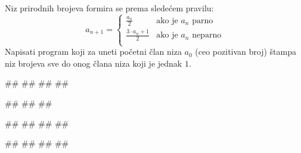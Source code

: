 \begin{Exercise}[difficulty=1, label=1.3_32] 
Niz prirodnih brojeva formira se prema sledećem pravilu:
\begin{equation*}
a_{n+1} = \left\{
\begin{array}{rl}
\frac{a_n}{2} & \text{ako je } a_n \text{ parno}\\
\frac{3\cdot a_n + 1}{2} & \text{ako je } a_n \text{ neparno}\\
\end{array} \right.
\end{equation*}
Napisati program koji za uneti početni član niza $a_0$ (ceo pozitivan
broj) štampa niz brojeva sve do onog člana niza koji je jednak $1$. 


\begin{miditest}
\begin{upotreba}{1}
#\naslovInt#
##
##
##
\end{upotreba}
\end{miditest}
\begin{miditest}
\begin{upotreba}{2}
#\naslovInt#
##
##
\end{upotreba}
\end{miditest}

\begin{miditest}
\begin{upotreba}{3}
#\naslovInt#
##
##
##
\end{upotreba}
\end{miditest}
\begin{miditest}
\begin{upotreba}{4}
#\naslovInt#
##
##
##
\end{upotreba}
\end{miditest}
\end{Exercise}
\begin{Answer}[ref=1.3_32]
\end{Answer}


